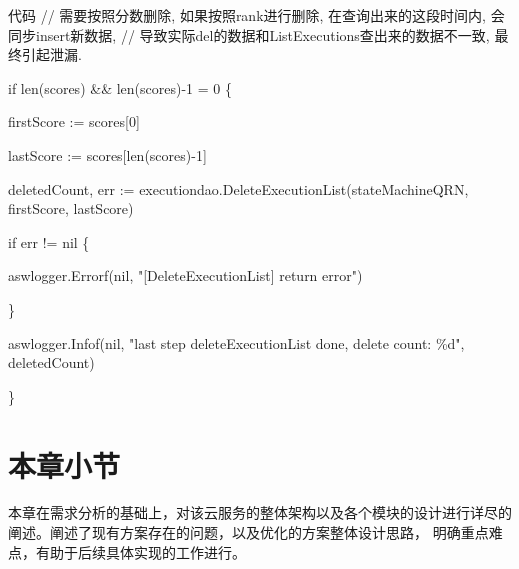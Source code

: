 代码
// 需要按照分数删除, 如果按照rank进行删除, 在查询出来的这段时间内, 会同步insert新数据,
// 导致实际del的数据和ListExecutions查出来的数据不一致, 最终引起泄漏.



\begin{algorithm}[h]
    \SetAlgoLined

    if len(scores)  \&\& len(scores)-1 \>= 0 \{

    firstScore := scores[0]

    lastScore := scores[len(scores)-1]

    deletedCount, err := executiondao.DeleteExecutionList(stateMachineQRN, firstScore, lastScore)

    if err != nil \{

    aswlogger.Errorf(nil, "[DeleteExecutionList] return error")

    \}

    aswlogger.Infof(nil, "last step deleteExecutionList done, delete count: \%d", deletedCount)

    \}
\end{algorithm}

\section{本章小节}
本章在需求分析的基础上，对该云服务的整体架构以及各个模块的设计进行详尽的阐述。阐述了现有方案存在的问题，以及优化的方案整体设计思路，
明确重点难点，有助于后续具体实现的工作进行。